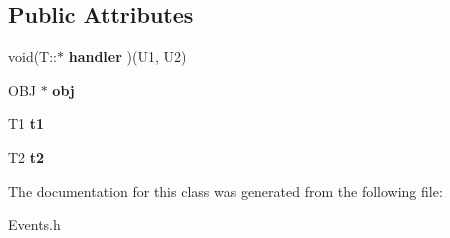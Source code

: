 \subsection*{Public Attributes}
\begin{DoxyCompactItemize}
\item 
\hypertarget{class_event2_a166c37cb53b2969dac38fa79b0349768}{void(T\-::$\ast$ {\bfseries handler} )(U1, U2)}\label{class_event2_a166c37cb53b2969dac38fa79b0349768}

\item 
\hypertarget{class_event2_ae87200a757f09d76ae6aa5abd293f062}{O\-B\-J $\ast$ {\bfseries obj}}\label{class_event2_ae87200a757f09d76ae6aa5abd293f062}

\item 
\hypertarget{class_event2_ab3e9b3c8ae4bff79e765e54a4947f371}{T1 {\bfseries t1}}\label{class_event2_ab3e9b3c8ae4bff79e765e54a4947f371}

\item 
\hypertarget{class_event2_ad921b4a0baa31fa2400fd022bf3b43e9}{T2 {\bfseries t2}}\label{class_event2_ad921b4a0baa31fa2400fd022bf3b43e9}

\end{DoxyCompactItemize}


The documentation for this class was generated from the following file\-:\begin{DoxyCompactItemize}
\item 
Events.\-h\end{DoxyCompactItemize}
